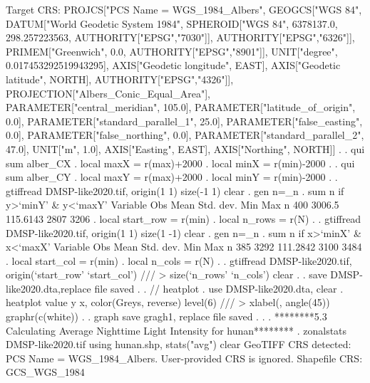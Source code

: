 Target CRS: PROJCS["PCS Name = WGS_1984_Albers", 
  GEOGCS["WGS 84", 
    DATUM["World Geodetic System 1984", 
      SPHEROID["WGS 84", 6378137.0, 298.257223563, AUTHORITY["EPSG","7030"]], 
      AUTHORITY["EPSG","6326"]], 
    PRIMEM["Greenwich", 0.0, AUTHORITY["EPSG","8901"]], 
    UNIT["degree", 0.017453292519943295], 
    AXIS["Geodetic longitude", EAST], 
    AXIS["Geodetic latitude", NORTH], 
    AUTHORITY["EPSG","4326"]], 
  PROJECTION["Albers_Conic_Equal_Area"], 
  PARAMETER["central_meridian", 105.0], 
  PARAMETER["latitude_of_origin", 0.0], 
  PARAMETER["standard_parallel_1", 25.0], 
  PARAMETER["false_easting", 0.0], 
  PARAMETER["false_northing", 0.0], 
  PARAMETER["standard_parallel_2", 47.0], 
  UNIT["m", 1.0], 
  AXIS["Easting", EAST], 
  AXIS["Northing", NORTH]]
{\smallskip}
. 
. qui sum alber_CX
{\smallskip}
. local maxX = r(max)+2000
{\smallskip}
. local minX = r(min)-2000
{\smallskip}
. 
. qui sum alber_CY
{\smallskip}
. local maxY = r(max)+2000
{\smallskip}
. local minY = r(min)-2000
{\smallskip}
. 
. gtiffread DMSP-like2020.tif, origin(1 1) size(-1 1) clear 
{\smallskip}
. gen n=_n
{\smallskip}
. sum n if y>`minY' \& y<`maxY'
{\smallskip}
    Variable {\VBAR}        Obs        Mean    Std. dev.       Min        Max
           n {\VBAR}        400      3006.5    115.6143       2807       3206
{\smallskip}
. local start_row = r(min)
{\smallskip}
. local n_rows = r(N)
{\smallskip}
. 
. gtiffread DMSP-like2020.tif, origin(1 1) size(1 -1) clear 
{\smallskip}
. gen n=_n
{\smallskip}
. sum n if x>`minX' \& x<`maxX'
{\smallskip}
    Variable {\VBAR}        Obs        Mean    Std. dev.       Min        Max
           n {\VBAR}        385        3292    111.2842       3100       3484
{\smallskip}
. local start_col = r(min)
{\smallskip}
. local n_cols = r(N)
{\smallskip}
. 
. gtiffread DMSP-like2020.tif, origin(`start_row' `start_col') ///
>                              size(`n_rows' `n_cols') clear
{\smallskip}
. 
. save DMSP-like2020.dta,replace
file{} saved
{\smallskip}
. 
. // heatplot
. use DMSP-like2020.dta, clear
{\smallskip}
. heatplot value y x, color(Greys, reverse) level(6) ///
>                 xlabel(, angle(45)) graphr(c(white))
{\smallskip}
. 
. graph save gragh1, replace
file {} saved
{\smallskip}
. 
. 
. ********5.3 Calculating Average Nighttime Light Intensity for hunan********
. zonalstats DMSP-like2020.tif using hunan.shp, stats("avg") clear
GeoTIFF CRS detected: PCS Name = WGS_1984_Albers. User-provided CRS is ignored.
Shapefile CRS: GCS_WGS_1984
